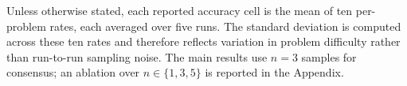 Unless otherwise stated, each reported accuracy cell is the mean of ten per-problem rates, each averaged over five runs. The standard deviation is computed across these ten rates and therefore reflects variation in problem difficulty rather than run-to-run sampling noise. The main results use $n=3$ samples for consensus; an ablation over $n\in\{1,3,5\}$ is reported in the Appendix.







